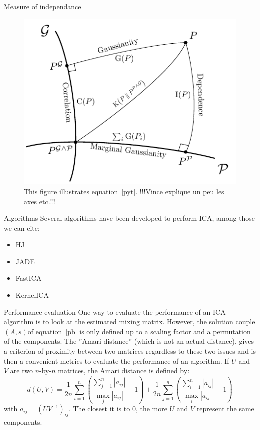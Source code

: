 \documentclass{beamer}
\begin{document}
\begin{frame}{}
\begin{columns}[T]
\begin{column}{.48\linewidth}
\begin{block}{Measure of independance}
\begin{figure}
\label{sketch}
\centering
  \includegraphics[width=.5\textwidth]{../figure_tikz/theory_info}
  \caption{This figure illustrates equation~\ref{pyt}. !!!Vince explique un peu les axes etc.!!!}
\end{figure}
\end{block}

\begin{block}{Algorithms}
Several algorithms have been developed to perform ICA, among those we can cite:
\begin{itemize}
		\item HJ
		\item JADE
		\item FastICA
		\item KernelICA
\end{itemize}

\end{block}

\begin{block}{Performance evaluation}
One way to evaluate the performance of an ICA algorithm is to look at the estimated mixing matrix. However, the solution couple $(A,s)$of equation~\ref{pb} is only defined up to a scaling factor and a permutation of the components. The ''Amari distance'' (which is not an actual distance), gives a criterion of proximity between two matrices regardless to these two issues and is then a convenient metrics to evaluate the performance of an algorithm.
If $U$ and $V$ are two $n$-by-$n$ matrices, the Amari distance is defined by:
\begin{equation}
	d(U,V) = \frac{1}{2n}\sum\limits_{i=1}^n \left(\frac{\sum\limits_{j=1}^n|a_{ij}|}{\max_j |a_{ij}|}-1 \right)+\frac{1}{2n}\sum\limits_{j=1}^n \left(\frac{\sum\limits_{i=1}^n|a_{ij}|}{\max_i |a_{ij}|}-1 \right)
\end{equation}
with $a_{ij} = (UV^{-1})_{ij}$. The closest it is to 0, the more $U$ and $V$ represent the same components.
\end{block}


\end{column}
\end{columns}
\end{frame}
\end{document}
